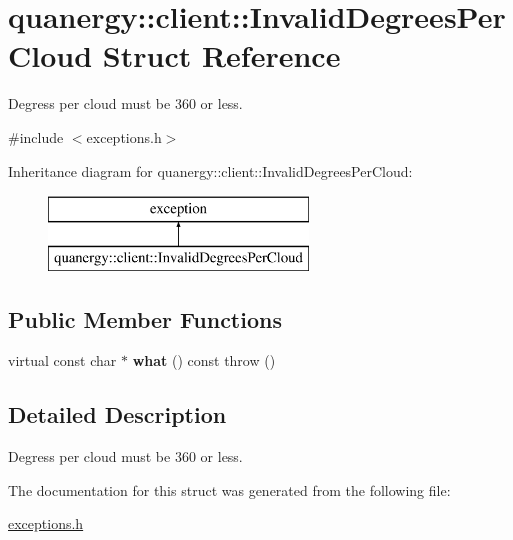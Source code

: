 \hypertarget{structquanergy_1_1client_1_1InvalidDegreesPerCloud}{\section{quanergy\-:\-:client\-:\-:Invalid\-Degrees\-Per\-Cloud Struct Reference}
\label{structquanergy_1_1client_1_1InvalidDegreesPerCloud}
}


Degress per cloud must be 360 or less.  




{\ttfamily \#include $<$exceptions.\-h$>$}

Inheritance diagram for quanergy\-:\-:client\-:\-:Invalid\-Degrees\-Per\-Cloud\-:\begin{figure}[H]
\begin{center}
\leavevmode
\includegraphics[height=2.000000cm]{structquanergy_1_1client_1_1InvalidDegreesPerCloud}
\end{center}
\end{figure}
\subsection*{Public Member Functions}
\begin{DoxyCompactItemize}
\item 
\hypertarget{structquanergy_1_1client_1_1InvalidDegreesPerCloud_abdf086dd2a96974a830c9b8b45c11a4f}{virtual const char $\ast$ {\bfseries what} () const   throw ()}\label{structquanergy_1_1client_1_1InvalidDegreesPerCloud_abdf086dd2a96974a830c9b8b45c11a4f}

\end{DoxyCompactItemize}


\subsection{Detailed Description}
Degress per cloud must be 360 or less. 

The documentation for this struct was generated from the following file\-:\begin{DoxyCompactItemize}
\item 
\hyperlink{exceptions_8h}{exceptions.\-h}\end{DoxyCompactItemize}
